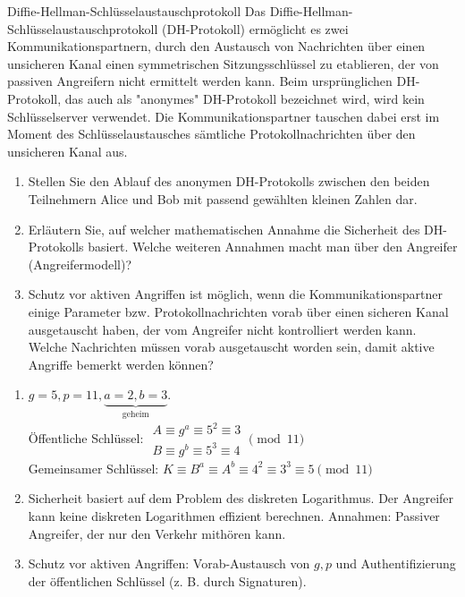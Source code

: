 \documentclass{article}
\begin{document}
\begin{exercise}{Diffie-Hellman-Schlüsselaustauschprotokoll}
  Das Diffie-Hellman-Schlüsselaustauschprotokoll (DH-Protokoll) ermöglicht es zwei Kommunikationspartnern, durch den Austausch von Nachrichten über einen unsicheren Kanal einen symmetrischen Sitzungsschlüssel zu etablieren, der von passiven Angreifern nicht ermittelt werden kann. Beim ursprünglichen DH-Protokoll, das auch als "anonymes" DH-Protokoll bezeichnet wird, wird kein Schlüsselserver verwendet. Die Kommunikationspartner tauschen dabei erst im Moment des Schlüsselaustausches sämtliche Protokollnachrichten über den unsicheren Kanal aus.
  \begin{enumerate}
    \item Stellen Sie den Ablauf des anonymen DH-Protokolls zwischen den beiden Teilnehmern Alice und Bob mit passend gewählten kleinen Zahlen dar.
    \item Erläutern Sie, auf welcher mathematischen Annahme die Sicherheit des DH-Protokolls basiert. Welche weiteren Annahmen macht man über den Angreifer (Angreifermodell)?
    \item Schutz vor aktiven Angriffen ist möglich, wenn die Kommunikationspartner einige Parameter bzw. Protokollnachrichten vorab über einen sicheren Kanal ausgetauscht haben, der vom Angreifer nicht kontrolliert werden kann. Welche Nachrichten müssen vorab ausgetauscht worden sein, damit aktive Angriffe bemerkt werden können?
  \end{enumerate}

  \begin{solution}
    \begin{enumerate}
        \item $g=5, p=11, \underbrace{a=2, b=3}_\text{geheim}$.\\
          Öffentliche Schlüssel: $\begin{array}{l}
              A\equiv g^a \equiv 5^2 \equiv 3\\
              B\equiv g^b \equiv 5^3 \equiv 4
            \end{array} \pmod{11}$\\
          Gemeinsamer Schlüssel: $K\equiv B^a\equiv A^b\equiv 4^2\equiv 3^3\equiv 5 \pmod{11}$
        \item Sicherheit basiert auf dem Problem des diskreten Logarithmus. Der Angreifer kann keine diskreten Logarithmen effizient berechnen. Annahmen: Passiver Angreifer, der nur den Verkehr mithören kann.
        \item Schutz vor aktiven Angriffen: Vorab-Austausch von $g, p$ und Authentifizierung der öffentlichen Schlüssel (z. B. durch Signaturen).
    \end{enumerate}
  \end{solution}
\end{exercise}
\end{document}
